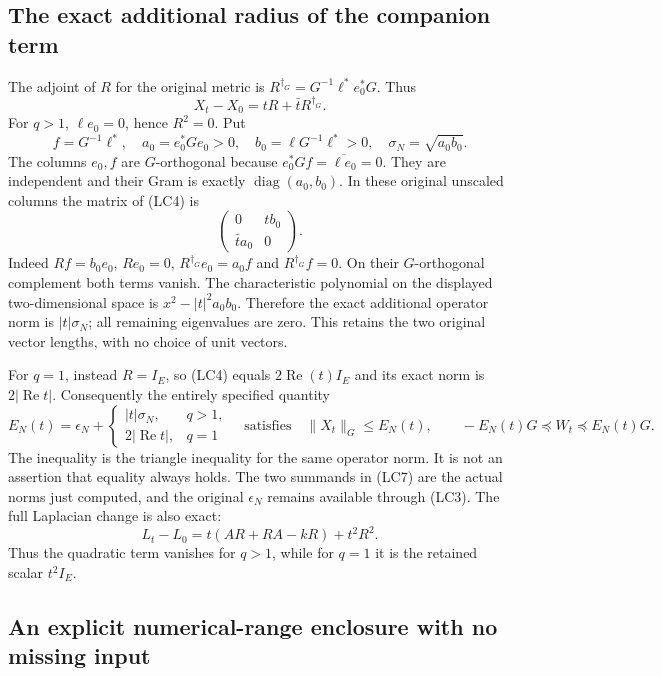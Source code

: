 \subsection{The exact additional radius of the companion term}

The adjoint of \(R\) for the original metric is
\(R^{\dagger_G}=G^{-1}\ell^*e_0^*G\). Thus
\[
 X_t-X_0=tR+\bar tR^{\dagger_G}.
 \tag{LC4}
\]
For \(q>1\), \(\ell e_0=0\), hence \(R^2=0\). Put
\[
 f=G^{-1}\ell^*,\quad a_0=e_0^*Ge_0>0,\quad
 b_0=\ell G^{-1}\ell^*>0,\quad
 \sigma_N=\sqrt{a_0b_0}.
 \tag{LC5}
\]
The columns \(e_0,f\) are \(G\)-orthogonal because
\(e_0^*Gf=\overline{\ell e_0}=0\). They are independent and their
Gram is exactly \(\operatorname{diag}(a_0,b_0)\). In these original
unscaled columns the matrix of (LC4) is
\[
 \begin{pmatrix}0&t b_0\\\bar t a_0&0\end{pmatrix}.
 \tag{LC6}
\]
Indeed \(Rf=b_0e_0\), \(R e_0=0\),
\(R^{\dagger_G}e_0=a_0 f\) and
\(R^{\dagger_G}f=0\). On their \(G\)-orthogonal complement both
terms vanish. The characteristic polynomial on the displayed
two-dimensional space is \(x^2-|t|^2a_0b_0\). Therefore the exact
additional operator norm is \(|t|\sigma_N\); all remaining
eigenvalues are zero. This retains the two original vector lengths,
with no choice of unit vectors.

For \(q=1\), instead \(R=I_E\), so (LC4) equals
\(2\operatorname{Re}(t)I_E\) and its exact norm is
\(2|\operatorname{Re}t|\). Consequently the entirely specified
quantity
\[
 E_N(t)=\epsilon_N+
 \begin{cases}|t|\sigma_N,&q>1,\\
               2|\operatorname{Re}t|,&q=1
 \end{cases}
 \quad\text{satisfies}\quad
 \|X_t\|_G\le E_N(t),\qquad
 -E_N(t)G\preceq W_t\preceq E_N(t)G.
 \tag{LC7}
\]
The inequality is the triangle inequality for the same operator
norm. It is not an assertion that equality always holds. The two
summands in (LC7) are the actual norms just computed, and the
original \(\epsilon_N\) remains available through (LC3).
The full Laplacian change is also exact:
\[
 L_t-L_0=t(AR+RA-kR)+t^2R^2.
 \tag{LC8}
\]
Thus the quadratic term vanishes for \(q>1\), while for \(q=1\)
it is the retained scalar \(t^2I_E\).

\subsection{An explicit numerical-range enclosure with no missing input}

